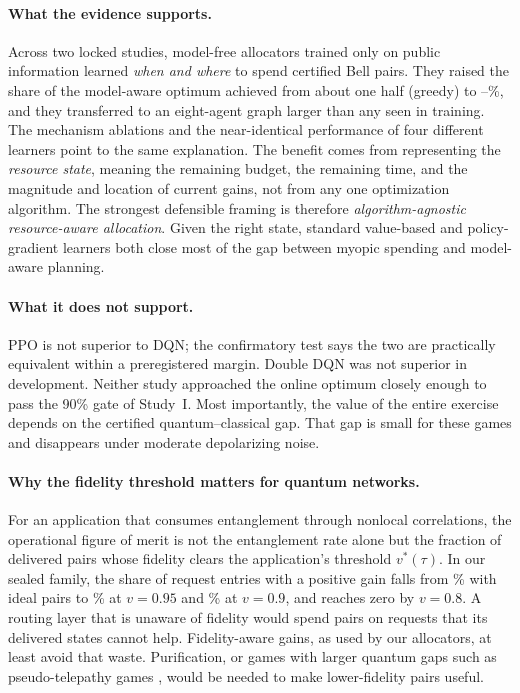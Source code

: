 \documentclass[11pt,a4paper]{article}
\begin{document}
\paragraph{What the evidence supports.} Across two locked studies, model-free allocators trained only on public information learned \emph{when and where} to spend certified Bell pairs. They raised the share of the model-aware optimum achieved from about one half (greedy) to \fracPPO--\fracDQN\%, and they transferred to an eight-agent graph larger than any seen in training. The mechanism ablations and the near-identical performance of four different learners point to the same explanation. The benefit comes from representing the \emph{resource state}, meaning the remaining budget, the remaining time, and the magnitude and location of current gains, not from any one optimization algorithm. The strongest defensible framing is therefore \emph{algorithm-agnostic resource-aware allocation}. Given the right state, standard value-based and policy-gradient learners both close most of the gap between myopic spending and model-aware planning.

\paragraph{What it does not support.} PPO is not superior to DQN; the confirmatory test says the two are practically equivalent within a preregistered margin. Double DQN was not superior in development. Neither study approached the online optimum closely enough to pass the 90\% gate of Study~I. Most importantly, the value of the entire exercise depends on the certified quantum--classical gap. That gap is small for these games and disappears under moderate depolarizing noise.

\paragraph{Why the fidelity threshold matters for quantum networks.} For an application that consumes entanglement through nonlocal correlations, the operational figure of merit is not the entanglement rate alone but the fraction of delivered pairs whose fidelity clears the application's threshold $v^*(\tau)$. In our sealed family, the share of request entries with a positive gain falls from \posOppIdeal\% with ideal pairs to \posOppNineFive\% at $v=0.95$ and \posOppNine\% at $v=0.9$, and reaches zero by $v=0.8$. A routing layer that is unaware of fidelity would spend pairs on requests that its delivered states cannot help. Fidelity-aware gains, as used by our allocators, at least avoid that waste. Purification, or games with larger quantum gaps such as pseudo-telepathy games \cite{brassard2005quantum}, would be needed to make lower-fidelity pairs useful.
\end{document}
